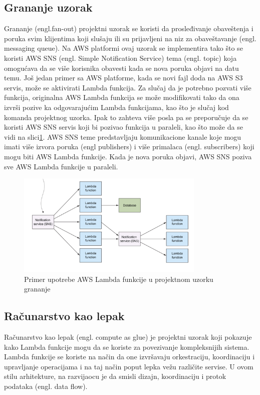 \documentclass[12pt,oneside]{memoir}
\begin{document}
\subsection{Grananje uzorak} %
Grananje (engl.fan-out) projektni uzorak se koristi da prosleđivanje obaveštenja i poruka svim klijentima koji slušaju ili su prijavljeni na niz za obaveštavanje (engl. messaging queue). Na AWS platformi ovaj uzorak se implementira tako što se koristi AWS SNS (engl. Simple Notification Service) tema (engl. topic) koja omogućava da se više korisnika obavesti kada se nova poruka objavi na datu temu. Još jedan primer sa AWS platforme, kada se novi fajl doda na AWS S3 servis, može se aktivirati Lambda funkcija. Za slučaj da je potrebno pozvati više funkcija, originalna AWS Lambda funkcija se može modifikovati tako da ona izvrši pozive ka odgovarajućim Lambda funkcijama, kao što je slučaj kod komanda projektnog uzorka. Ipak to zahteva više posla pa se preporučuje da se koristi AWS SNS servis koji bi pozivao funkcija u paraleli, kao što može da se vidi na slici\ref{fig:grananje}. AWS SNS teme predstavljaju komunikacione kanale koje mogu imati više izvora poruka (engl publishers) i više primalaca (engl. subscribers) koji mogu biti AWS Lambda funkcije. Kada je nova poruka objavi, AWS SNS poziva sve AWS Lambda funkcije u paraleli.

\begin{figure}[!ht]
  \centering
  \includegraphics[width=0.8\textwidth]{Slika 15.png}
  \caption{Primer upotrebe AWS Lambda funkcije u projektnom uzorku grananje}
  \label{fig:grananje}
\end{figure}

\subsection{Računarstvo kao lepak} %
Računarstvo kao lepak (engl. compute as glue) je projektni uzorak koji pokazuje kako Lambda funkcije mogu da se koriste za povezivanje kompleksnijih sistema. Lambda funkcije se koriste na način da one izvršavaju orkestraciju, koordinaciju i upravljanje operacijama i na taj način poput lepka vežu različite servise. U ovom stilu arhitekture, na razvijaocu je da smisli dizajn, koordinaciju i protok podataka (engl. data flow). 
 
\end{document}
